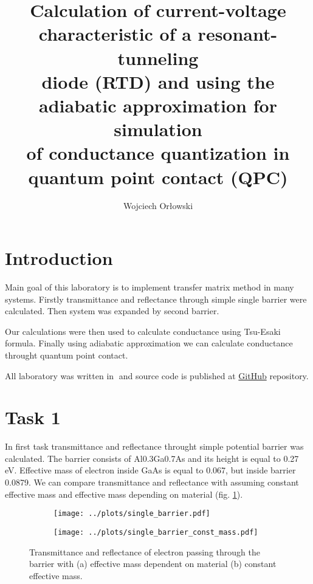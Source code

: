 \documentclass[12pt, a4paper]{article}
\author{Wojciech Orłowski}
\title{Calculation of current-voltage characteristic of a resonant-tunneling \\
diode (RTD) and using the adiabatic approximation for simulation \\
of conductance quantization in quantum point contact (QPC)}
\begin{document}
\maketitle

\section*{Introduction}

Main goal of this laboratory is to implement transfer matrix method in many systems.
Firstly transmittance and reflectance through simple single barrier were calculated.
Then system was expanded by second barrier.

Our calculations were then used to calculate conductance using Tsu-Esaki formula.
Finally using adiabatic approximation we can calculate conductance throught quantum point contact.

All laboratory was written in \julia $\;$and source code is published at \href{https://github.com/OrlowskiWojtek/QuantumTransport/tree/2bb1eba9f6fcc11de530fe850330eb98d213b3ef/lab2}{GitHub} repository.

\newpage

\section*{Task 1}

In first task transmittance and reflectance throught simple potential barrier was calculated.
The barrier consists of Al0.3Ga0.7As and its height is equal to 0.27 eV.
Effective mass of electron inside GaAs is equal to 0.067, but inside barrier 0.0879.
We can compare transmittance and reflectance with assuming constant effective mass and effective mass depending on material (fig. \ref{fig:single_barier}).

\begin{figure}[h]
    \begin{subfigure}{0.49\textwidth}
        \begin{center}
            \texttt{[image: ../plots/single\_barrier.pdf]}
        \end{center}
        \caption{}
    \end{subfigure}
    \begin{subfigure}{0.49\textwidth}
        \begin{center}
            \texttt{[image: ../plots/single\_barrier\_const\_mass.pdf]}
        \end{center}
        \caption{}
    \end{subfigure}

    \caption{Transmittance and reflectance of electron passing through the barrier with (a) effective mass dependent on material (b) constant effective mass.}
    \label{fig:single_barier}
\end{figure}
\end{document}
